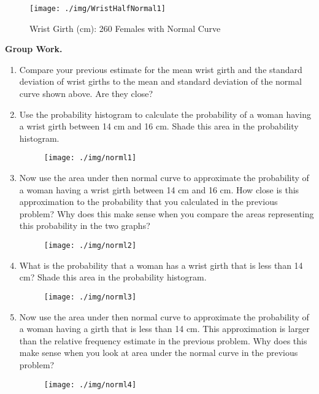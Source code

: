 \begin{figure}[H]
\centering{}\texttt{[image: ./img/WristHalfNormal1]} \caption{Wrist Girth (cm): 260 Females with Normal Curve}
\end{figure}

\textbf{Group Work.}
\begin{enumerate}
\item Compare your previous estimate for the mean wrist girth and the standard deviation of wrist girths to the mean and standard deviation of the normal curve shown above. Are they close? 
\item Use the probability histogram to calculate the probability of a woman having a wrist girth between 14 cm and 16 cm. Shade this area in the probability histogram.
\begin{figure}[H]
\centering{}\texttt{[image: ./img/norml1]} 
\end{figure}
\newpage
\item Now use the area under then normal curve to approximate the probability of a woman having a wrist girth between 14 cm and 16 cm. How close is this approximation to the probability that you calculated in the previous problem? Why does this make sense when you compare the areas representing this probability in the two graphs? 
\begin{figure}[H]
\centering{}\texttt{[image: ./img/norml2]} 
\end{figure}

\item What is the probability that a woman has a wrist girth that is less than 14 cm? Shade this area in the probability histogram. 
\begin{figure}[H]
\centering{}\texttt{[image: ./img/norml3]} 
\end{figure}

\item Now use the area under then normal curve to approximate the probability of a woman having a girth that is less than 14 cm. This approximation is larger than the relative frequency estimate in the previous problem. Why does this make sense when you look at area under the normal curve in the previous problem?
\begin{figure}[H]
\centering{}\texttt{[image: ./img/norml4]} 
\end{figure}

\end{enumerate}

